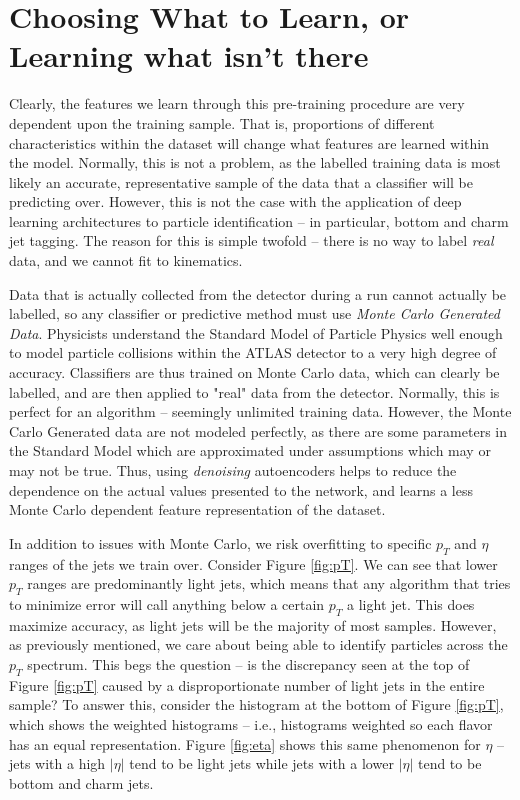 \section{Choosing What to Learn, or Learning what isn't there}

Clearly, the features we learn through this pre-training procedure are very dependent upon the training sample. That is, proportions of different characteristics within the dataset will change what features are learned within the model. Normally, this is not a problem, as the labelled training data is most likely an accurate, representative sample of the data that a classifier will be predicting over. However, this is not the case with the application of deep learning architectures to particle identification -- in particular, bottom and charm jet tagging. The reason for this is simple twofold -- there is no way to label \emph{real} data, and we cannot fit to kinematics. 

Data that is actually collected from the detector during a run cannot actually be labelled, so any classifier or predictive method must use \emph{Monte Carlo Generated Data}. Physicists understand the Standard Model of Particle Physics well enough to model particle collisions within the ATLAS detector to a very high degree of accuracy. Classifiers are thus trained on Monte Carlo data, which can clearly be labelled, and are then applied to "real" data from the detector. Normally, this is perfect for an algorithm -- seemingly unlimited training data. However, the Monte Carlo Generated data are not modeled perfectly, as there are some parameters in the Standard Model which are approximated under assumptions which may or may not be true. Thus, using \emph{denoising} autoencoders helps to reduce the dependence on the actual values presented to the network, and learns a less Monte Carlo dependent feature representation of the dataset.

In addition to issues with Monte Carlo, we risk overfitting to specific $p_T$ and $\eta$ ranges of the jets we train over. Consider Figure \ref{fig:pT}. We can see that lower $p_T$ ranges are predominantly light jets, which means that any algorithm that tries to minimize error will call anything below a certain $p_T$ a light jet. This does maximize accuracy, as light jets will be the majority of most samples. However, as previously mentioned, we care about being able to identify particles across the $p_T$ spectrum. This begs the question -- is the discrepancy seen at the top of Figure \ref{fig:pT} caused by a disproportionate number of light jets in the entire sample? To answer this, consider the histogram at the bottom of Figure \ref{fig:pT}, which shows the weighted histograms -- i.e., histograms weighted so each flavor has an equal representation. Figure \ref{fig:eta} shows this same phenomenon for $\eta$ -- jets with a high $\vert\eta\vert$ tend to be light jets while jets with a lower $\vert\eta\vert$ tend to be bottom and charm jets. 

